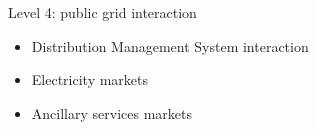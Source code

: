 \begin{frame}{Level 4: public grid interaction}

\begin{itemize}
\item Distribution Management System interaction
\item Electricity markets
\item Ancillary services markets
\end{itemize}
\end{frame}

%  
%  
